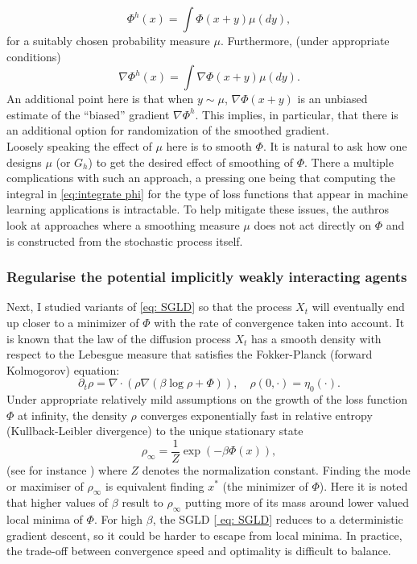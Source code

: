 \documentclass{article}
\begin{document}
\[
\Phi^{h}\left(x\right)=\int\Phi(x+y)\mu(dy),
\]
for a suitably chosen probability measure $\mu$. Furthermore, (under
appropriate conditions) 
\begin{equation}
\nabla\Phi^{h}\left(x\right)=\int\nabla\Phi(x+y)\mu(dy).\label{eq:smooth_grad}
\end{equation}
An additional point here is that when $y\sim\mu$, $\nabla\Phi(x+y)$
is an unbiased estimate of the ``biased'' gradient $\nabla\Phi^{h}$.
This implies, in particular, that there is an additional option for
randomization of the smoothed gradient.\\ 

Loosely speaking the effect of $\mu$ here is to smooth $\Phi$.
It is natural to ask how one designs $\mu$ (or $G_{h}$)
to get the desired effect of smoothing of $\Phi$. There a multiple complications with such an approach, a pressing one being that computing the integral in \ref{eq:integrate phi}
for the type of loss functions that appear in machine learning applications
is intractable. To help mitigate these issues, the authros look at approaches where a smoothing measure $\mu$ does not act directly on $\Phi$ and is constructed from the stochastic process itself.


\subsubsection{Regularise the potential implicitly weakly interacting agents}\label{sec: weakly interacting agents}

Next, I studied variants of \ref{eq: SGLD} so that the
process $X_{t}$ will eventually end up closer to a minimizer of $\Phi$ with the rate of convergence taken into account. It is known that the law of the diffusion process $X_{t}$
has a smooth density with respect to the Lebesgue measure that satisfies
the Fokker-Planck (forward Kolmogorov) equation: 
\[
\partial_{t}\rho=\nabla\cdot\left(\rho\nabla\left(\beta\log\rho+\Phi\right)\right),\quad\rho(0,\cdot)=\eta_{0}(\cdot).
\]
Under appropriate relatively mild assumptions on the growth of the loss function $\Phi$
at infinity, the density $\rho$ converges exponentially fast in relative
entropy (Kullback-Leibler divergence) to the unique stationary state
\[
\rho_{\infty}=\frac{1}{Z}\exp(-\beta\Phi(x)),
\]
(see for instance \cite[Ch. 4]{pavliotis2014stochastic}) where $Z$ denotes the normalization constant.
Finding the mode or maximiser of $\rho_{\infty}$ is equivalent finding
$x^{*}$ (the minimizer of $ \Phi$). Here it is noted that higher values of $ \beta$
result to $\rho_{\infty}$ putting more of its mass around lower valued
local minima of $\Phi$. For high $\beta$, the SGLD \ref{ eq: SGLD}
reduces to a deterministic gradient descent, so it could be harder
to escape from local minima. In practice, the trade-off between convergence
speed and optimality is difficult to balance.
\end{document}
